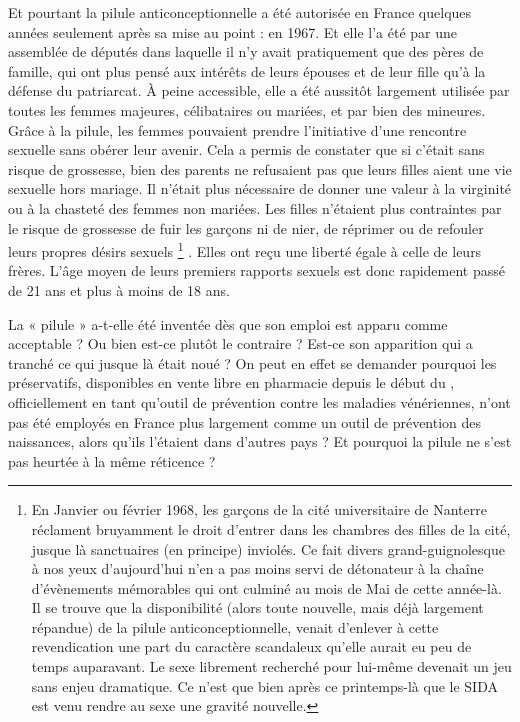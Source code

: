  Et pourtant la pilule anticonceptionnelle a été autorisée en France quelques années seulement après sa mise au point : en 1967. Et elle l'a été par une assemblée de députés dans laquelle il n'y avait pratiquement que des pères de famille, qui ont plus pensé aux intérêts de leurs épouses et de leur fille qu'à la défense du patriarcat. À peine accessible, elle a été aussitôt largement utilisée par toutes les femmes majeures, célibataires ou mariées, et par bien des mineures. Grâce à la pilule, les femmes pouvaient prendre l'initiative d'une rencontre sexuelle sans obérer leur avenir. Cela a permis de constater que si c'était sans risque de grossesse, bien des parents ne refusaient pas que leurs filles aient une vie sexuelle hors mariage. Il n'était plus nécessaire de donner une valeur à la virginité ou à la chasteté des femmes non mariées. Les filles n'étaient plus contraintes par le risque de grossesse de fuir les garçons ni de nier, de réprimer ou de refouler leurs propres désirs sexuels%
\footnote{En Janvier ou février 1968, les garçons de la cité universitaire de Nanterre réclament bruyamment le droit d'entrer dans les chambres des filles de la cité, jusque là sanctuaires (en principe) inviolés. Ce fait divers grand-guignolesque à nos yeux d'aujourd'hui n'en a pas moins servi de détonateur à la chaîne d'évènements mémorables qui ont culminé au mois de Mai de cette année-là. Il se trouve que la disponibilité (alors toute nouvelle, mais déjà largement répandue) de la pilule anticonceptionnelle, venait d'enlever à cette revendication une part du caractère scandaleux qu'elle aurait eu peu de temps auparavant. Le sexe librement recherché pour lui-même devenait un jeu sans enjeu dramatique. Ce n'est que bien après ce printemps-là que le SIDA est venu rendre au sexe une gravité nouvelle.}%
. Elles ont reçu une liberté égale à celle de leurs frères. L'âge moyen de leurs premiers rapports sexuels est donc rapidement passé de 21 ans et plus à moins de 18 ans.

 La « pilule » a-t-elle été inventée dès que son emploi est apparu comme acceptable ? Ou bien est-ce plutôt le contraire ? Est-ce son apparition qui a tranché ce qui jusque là était noué ? On peut en effet se demander pourquoi les préservatifs, disponibles en vente libre en pharmacie depuis le début du , officiellement en tant qu'outil de prévention contre les maladies vénériennes, n'ont pas été employés en France plus largement comme un outil de prévention des naissances, alors qu'ils l'étaient dans d'autres pays ? Et pourquoi la pilule ne s'est pas heurtée à la même réticence ? 

